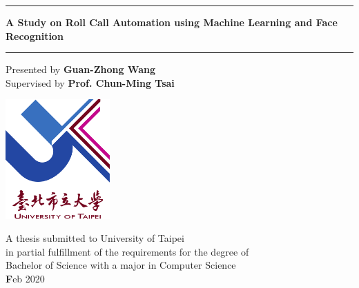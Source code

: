 \def\title{A Study on Roll Call Automation using Machine Learning and Face Recognition}
\def\author{Guan-Zhong Wang}
\def\supervisor{Prof. Chun-Ming Tsai}
\def\date{Feb 2020}

\begin{titlepage}
  \begin{center}
    \vspace*{3.5cm}

    \noindent\rule{16cm}{1.5pt}

    \vspace*{0.5cm}
    \textbf{\huge \title}
    \vspace*{0.5cm}
    \noindent\rule{16cm}{1.5pt}

    \vspace{0.5cm}
    {\large Presented by} \textbf{\Large \author}\\
    \vspace{0.3cm}
    {\large Supervised by} \textbf{\Large \supervisor}\\
    \vspace{1.2cm}

    \vspace{1.7cm}
    \includegraphics[width=0.3\textwidth]{figures/utaipei.png}
    \vspace{1.7cm}

    \vfill

    {\Large A thesis submitted to University of Taipei\\
      in partial fulfillment of the requirements for the degree of\\
      Bachelor of Science with a major in Computer Science\\
    }
    \vspace{1.2cm}
    {\Large \textbf\date}

    \vspace{3.5cm}

  \end{center}
\end{titlepage}
